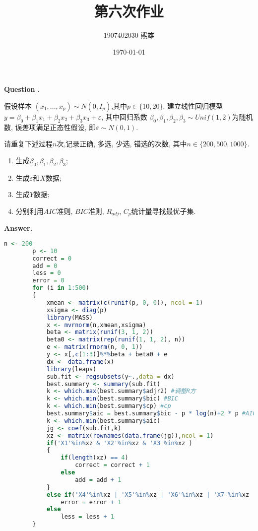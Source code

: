 \documentclass[12pt, a4paper, oneside]{ctexart}
\title{\textbf{第六次作业}}
\author{1907402030 熊雄}
\date{\today}
\newcounter{problemname}
\newenvironment{problem}{\begin{shaded}\stepcounter{problemname}\par\noindent  \textbf{Question \arabic{problemname}. }} {\end{shaded}\par}
\newenvironment{solution}{\par\noindent \textbf {Answer. }}{\par}
\begin{document}
 	\maketitle
\begin{problem}
	
	假设样本 $\left(x_1,...,x_p\right)\sim N\left(0,I_{p}\right)$,其中$p\in\{10,20\}$. 建立线性回归模型$y=\beta_0+\beta_1x_1+\beta_2x_2+\beta_3x_3+\varepsilon$, 其中回归系数 $\beta_0,\beta_1,\beta_2,\beta_3 \sim Unif(1,2)$为随机数, 误差项满足正态性假设, 即$\varepsilon \sim N(0,1)$.
	
	请重复下述过程$n$次,记录正确, 多选, 少选, 错选的次数, 其中$n\in\{200,500,1000\}$.
	\begin{enumerate}
			\item {\tt}生成$\beta_0,\beta_1,\beta_2,\beta_3$;
			\item {\tt}生成$\varepsilon$和$X$数据;
			\item {\tt}生成$Y$数据;
			\item {\tt}分别利用$AIC$准则, $BIC$准则, $R_{adj}$, $C_p$统计量寻找最优子集.
	\end{enumerate}
\end{problem}
\begin{solution}  
		{\setmainfont{Courier New Bold}  
\begin{lstlisting}[language=R]
		n <- 200
		p <- 10
		correct = 0
		add = 0
		less = 0
		error = 0
		for (i in 1:500)
		{
			xmean <- matrix(c(runif(p, 0, 0)), ncol = 1)
			xsigma <- diag(p)
			library(MASS)
			x <- mvrnorm(n,xmean,xsigma)
			beta <- matrix(runif(3, 1, 2))
			beta0 <- matrix(rep(runif(1, 1, 2), n))
			e <- matrix(rnorm(n, 0, 1))
			y <- x[,c(1:3)]%*%beta + beta0 + e
			dx <- data.frame(x)
			library(leaps)
			sub.fit <- regsubsets(y~.,data = dx)
			best.summary <- summary(sub.fit)
			k <- which.max(best.summary$adjr2) #调整R方
			k <- which.min(best.summary$bic) #BIC
			k <- which.min(best.summary$cp) #cp
			best.summary$aic = best.summary$bic - p * log(n)+2 * p #AIC
			k <- which.min(best.summary$aic)
			jg <- coef(sub.fit,k)
			xz <- matrix(rownames(data.frame(jg)),ncol = 1)
			if('X1'%in%xz & 'X2'%in%xz & 'X3'%in%xz )
			{
				if(length(xz) == 4)
					correct = correct + 1
				else
					add = add + 1
			}
			else if('X4'%in%xz | 'X5'%in%xz | 'X6'%in%xz | 'X7'%in%xz | 'X8'%in%xz | 'X9'%in%xz |'X10'%in%xz)
				error = error + 1
			else 
				less = less + 1
		}
\end{lstlisting}
\end{solution}
\end{document}
